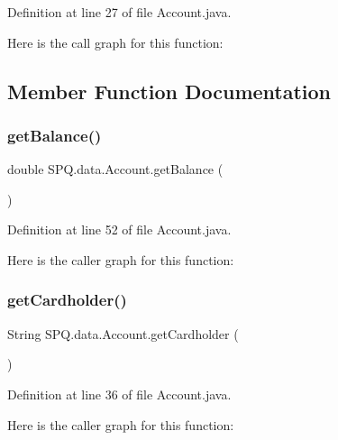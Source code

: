 Definition at line 27 of file Account.\+java.

Here is the call graph for this function\+:


\subsection{Member Function Documentation}
\mbox{\label{class_s_p_q_1_1data_1_1_account_a39cb32b817edf85d7cf23d9b39bb0dc5}} 
\subsubsection{\texorpdfstring{get\+Balance()}{getBalance()}}
{\footnotesize\ttfamily double S\+P\+Q.\+data.\+Account.\+get\+Balance (\begin{DoxyParamCaption}{ }\end{DoxyParamCaption})}



Definition at line 52 of file Account.\+java.

Here is the caller graph for this function\+:
\mbox{\label{class_s_p_q_1_1data_1_1_account_ab4297cf24cbff2975364306a31e75db9}} 
\subsubsection{\texorpdfstring{get\+Cardholder()}{getCardholder()}}
{\footnotesize\ttfamily String S\+P\+Q.\+data.\+Account.\+get\+Cardholder (\begin{DoxyParamCaption}{ }\end{DoxyParamCaption})}



Definition at line 36 of file Account.\+java.

Here is the caller graph for this function\+:
\mbox{\label{class_s_p_q_1_1data_1_1_account_a54797a8ae92cb43fa9126700579ca9bf}} 

